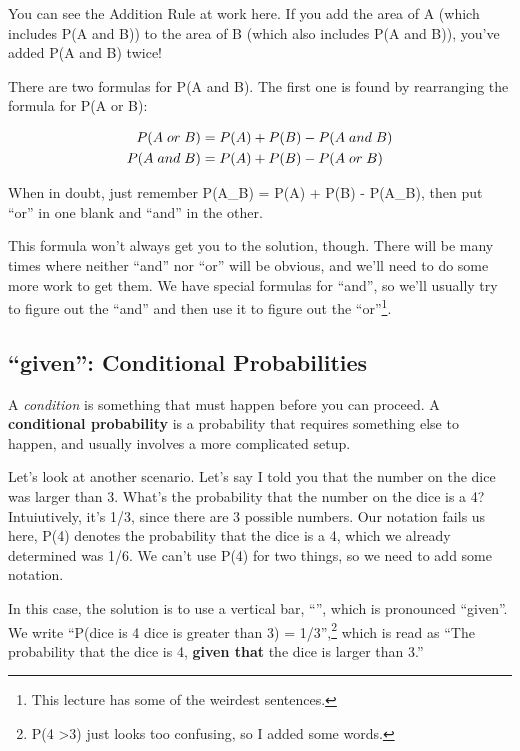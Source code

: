 \documentclass[
  letterpaper,
  DIV=11,
  numbers=noendperiod]{scrreprt}
\begin{document}
You can see the Addition Rule at work here. If you add the area of A
(which includes P(A and B)) to the area of B (which also includes P(A
and B)), you've added P(A and B) twice!

There are two formulas for P(A and B). The first one is found by
rearranging the formula for P(A or B):

\begin{align*}
\small P(A\; or\; B) &\small = P(A) + P(B) - P(A \;and\; B)\\
\small P(A\; and\; B) &\small = P(A) + P(B) - P(A \;or\; B)
\end{align*}

When in doubt, just remember P(A\_B) = P(A) + P(B) - P(A\_B), then put
``or'' in one blank and ``and'' in the other.

This formula won't always get you to the solution, though. There will be
many times where neither ``and'' nor ``or'' will be obvious, and we'll
need to do some more work to get them. We have special formulas for
``and'', so we'll usually try to figure out the ``and'' and then use it
to figure out the ``or''\footnote{This lecture has some of the weirdest
  sentences.}.

\hypertarget{given-conditional-probabilities}{%
\subsection{``given'': Conditional
Probabilities}\label{given-conditional-probabilities}}

A \emph{condition} is something that must happen before you can proceed.
A \textbf{conditional probability} is a probability that requires
something else to happen, and usually involves a more complicated setup.

Let's look at another scenario. Let's say I told you that the number on
the dice was larger than 3. What's the probability that the number on
the dice is a 4? Intuiutively, it's 1/3, since there are 3 possible
numbers. Our notation fails us here, P(4) denotes the probability that
the dice is a 4, which we already determined was 1/6. We can't use P(4)
for two things, so we need to add some notation.

In this case, the solution is to use a vertical bar, ``\textbar{}'',
which is pronounced ``given''. We write ``P(dice is 4 \textbar{} dice is
greater than 3) = 1/3'',\footnote{P(4 \textbar{} \textgreater3) just
  looks too confusing, so I added some words.} which is read as ``The
probability that the dice is 4, \textbf{given that} the dice is larger
than 3.''
\end{document}
